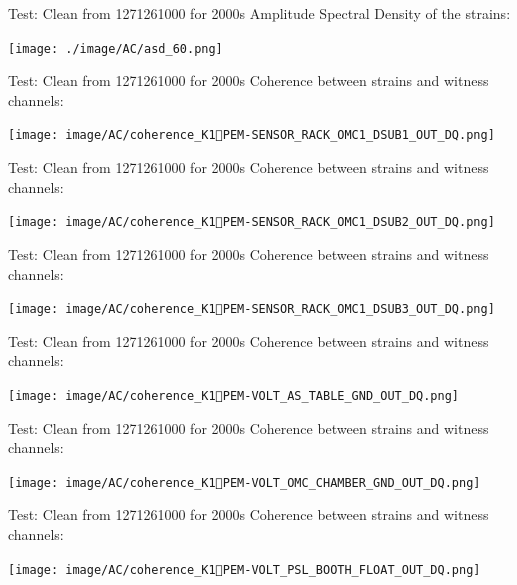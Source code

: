 \documentclass[xcolor=dvipsnames]{beamer}
\begin{document}
\begin{frame}[t]{Test: Clean from 1271261000 for 2000s}
  Amplitude Spectral Density of the strains:
  \begin{center}
    \texttt{[image: ./image/AC/asd\_60.png]}
  \end{center}
\end{frame}

\begin{frame}[t]{Test: Clean from 1271261000 for 2000s}
  Coherence between strains and witness channels:
  \begin{center}
    \texttt{[image: image/AC/coherence\_K1PEM-SENSOR\_RACK\_OMC1\_DSUB1\_OUT\_DQ.png]}
  \end{center}
\end{frame}

\begin{frame}[t]{Test: Clean from 1271261000 for 2000s}
  Coherence between strains and witness channels:
  \begin{center}
    \texttt{[image: image/AC/coherence\_K1PEM-SENSOR\_RACK\_OMC1\_DSUB2\_OUT\_DQ.png]}
  \end{center}
\end{frame}

\begin{frame}[t]{Test: Clean from 1271261000 for 2000s}
  Coherence between strains and witness channels:
  \begin{center}
    \texttt{[image: image/AC/coherence\_K1PEM-SENSOR\_RACK\_OMC1\_DSUB3\_OUT\_DQ.png]}
  \end{center}
\end{frame}

\begin{frame}[t]{Test: Clean from 1271261000 for 2000s}
  Coherence between strains and witness channels:
  \begin{center}
    \texttt{[image: image/AC/coherence\_K1PEM-VOLT\_AS\_TABLE\_GND\_OUT\_DQ.png]}
  \end{center}
\end{frame}

\begin{frame}[t]{Test: Clean from 1271261000 for 2000s}
  Coherence between strains and witness channels:
  \begin{center}
    \texttt{[image: image/AC/coherence\_K1PEM-VOLT\_OMC\_CHAMBER\_GND\_OUT\_DQ.png]}
  \end{center}
\end{frame}

\begin{frame}[t]{Test: Clean from 1271261000 for 2000s}
  Coherence between strains and witness channels:
  \begin{center}
    \texttt{[image: image/AC/coherence\_K1PEM-VOLT\_PSL\_BOOTH\_FLOAT\_OUT\_DQ.png]}
  \end{center}
\end{frame}
\end{document}
